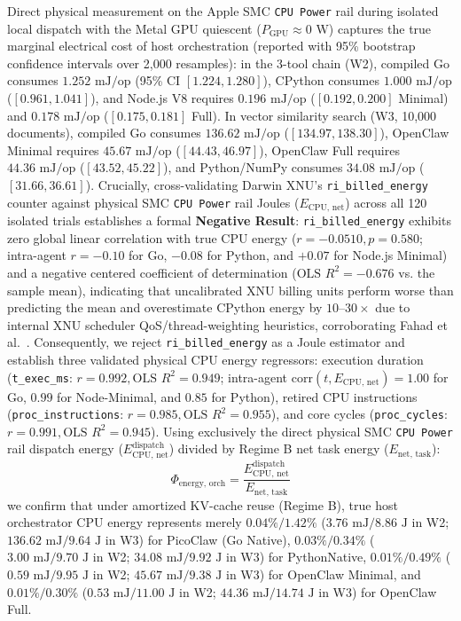 \documentclass[11pt,a4paper]{article}
\begin{document}
Direct physical measurement on the Apple SMC \texttt{CPU Power} rail during isolated local dispatch with the Metal GPU quiescent ($P_{\text{GPU}} \approx 0\text{ W}$) captures the true marginal electrical cost of host orchestration (reported with 95\% bootstrap confidence intervals over 2,000 resamples): in the 3-tool chain (W2), compiled Go consumes $1.252\text{ mJ/op}$ (95\% CI $[1.224, 1.280]$), CPython consumes $1.000\text{ mJ/op}$ ($[0.961, 1.041]$), and Node.js V8 requires $0.196\text{ mJ/op}$ ($[0.192, 0.200]$ Minimal) and $0.178\text{ mJ/op}$ ($[0.175, 0.181]$ Full). In vector similarity search (W3, 10,000 documents), compiled Go consumes $136.62\text{ mJ/op}$ ($[134.97, 138.30]$), OpenClaw Minimal requires $45.67\text{ mJ/op}$ ($[44.43, 46.97]$), OpenClaw Full requires $44.36\text{ mJ/op}$ ($[43.52, 45.22]$), and Python/NumPy consumes $34.08\text{ mJ/op}$ ($[31.66, 36.61]$). Crucially, cross-validating Darwin XNU's \texttt{ri\_billed\_energy} counter against physical SMC \texttt{CPU Power} rail Joules ($E_{\text{CPU, net}}$) across all 120 isolated trials establishes a formal \textbf{Negative Result}: \texttt{ri\_billed\_energy} exhibits zero global linear correlation with true CPU energy ($r = -0.0510, p = 0.580$; intra-agent $r = -0.10$ for Go, $-0.08$ for Python, and $+0.07$ for Node.js Minimal) and a negative centered coefficient of determination ($\text{OLS } R^2 = -0.676$ vs. the sample mean), indicating that uncalibrated XNU billing units perform worse than predicting the mean and overestimate CPython energy by $10\text{--}30\times$ due to internal XNU scheduler QoS/thread-weighting heuristics, corroborating Fahad et al.~\cite{fahad2019comparative}. Consequently, we reject \texttt{ri\_billed\_energy} as a Joule estimator and establish three validated physical CPU energy regressors: execution duration (\texttt{t\_exec\_ms}: $r = 0.992, \text{OLS } R^2 = 0.949$; intra-agent $\text{corr}(t, E_{\text{CPU, net}}) = 1.00$ for Go, $0.99$ for Node-Minimal, and $0.85$ for Python), retired CPU instructions (\texttt{proc\_instructions}: $r = 0.985, \text{OLS } R^2 = 0.955$), and core cycles (\texttt{proc\_cycles}: $r = 0.991, \text{OLS } R^2 = 0.945$). Using exclusively the direct physical SMC \texttt{CPU Power} rail dispatch energy ($E_{\text{CPU, net}}^{\text{dispatch}}$) divided by Regime B net task energy ($E_{\text{net, task}}$):
\begin{equation}
\Phi_{\text{energy, orch}} = \frac{E_{\text{CPU, net}}^{\text{dispatch}}}{E_{\text{net, task}}}
\end{equation}
we confirm that under amortized KV-cache reuse (Regime B), true host orchestrator CPU energy represents merely $0.04\% / 1.42\%$ ($3.76\text{ mJ} / 8.86\text{ J}$ in W2; $136.62\text{ mJ} / 9.64\text{ J}$ in W3) for PicoClaw (Go Native), $0.03\% / 0.34\%$ ($3.00\text{ mJ} / 9.70\text{ J}$ in W2; $34.08\text{ mJ} / 9.92\text{ J}$ in W3) for PythonNative, $0.01\% / 0.49\%$ ($0.59\text{ mJ} / 9.95\text{ J}$ in W2; $45.67\text{ mJ} / 9.38\text{ J}$ in W3) for OpenClaw Minimal, and $0.01\% / 0.30\%$ ($0.53\text{ mJ} / 11.00\text{ J}$ in W2; $44.36\text{ mJ} / 14.74\text{ J}$ in W3) for OpenClaw Full.
\end{document}
